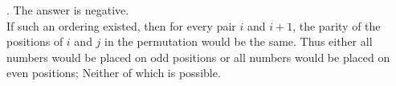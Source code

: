 \begin{solution}.
The answer is negative.\\[0.2cm]

If such an ordering existed, then for every pair $i$ and $i+1$, the parity of the positions of $i$ and $j$ in the permutation would be the same. Thus either all numbers would be placed on odd positions or all numbers would be placed on even positions; Neither of which is  possible.
\end{solution}